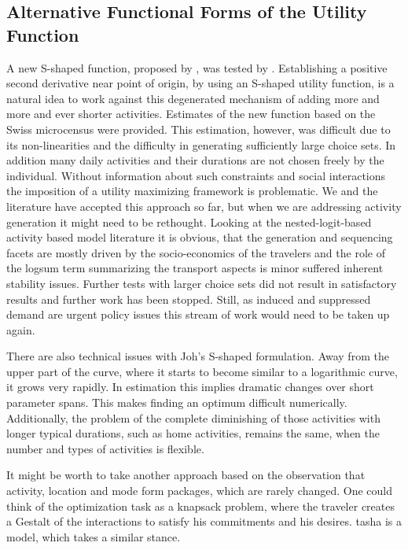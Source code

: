 \subsection{Alternative Functional Forms of the Utility Function}
\label{sec:alternative-functions}
A new S-shaped function, proposed by \citet[][]{Joh_PhDThesis_2004}, was tested by \citet[][p.129ff]{Feil_PhDThesis_2010}. 
Establishing a positive second derivative near point of origin, by using an S-shaped utility function, is a natural idea to work against this degenerated mechanism of adding more and more and ever shorter activities. 
Estimates of the new function based on the Swiss microcensus were provided. 
This estimation, however, was difficult due to its non-linearities and the difficulty in generating sufficiently large choice sets. 
In addition many daily activities and their durations are not chosen freely by the individual. 
Without information about such constraints and social interactions the imposition of a utility maximizing framework is problematic. 
We and the literature have accepted this approach so far, but when we are addressing activity generation it might need to be rethought. 
Looking at the nested-logit-based activity based model literature it is obvious, that the generation and sequencing facets are mostly driven by the socio-economics of the travelers and the role of the logsum term summarizing the transport aspects is minor suffered inherent stability issues. 
Further tests with larger choice sets did not result in satisfactory results and further work has been stopped. 
Still, as induced and suppressed demand are urgent policy issues this stream of work would need to be taken up again. 

There are also technical issues with Joh's S-shaped formulation. %
Away from the upper part of the curve, where it starts to become similar to a logarithmic curve, it grows very rapidly. 
In estimation this implies dramatic changes over short parameter spans. 
This makes finding an optimum difficult numerically. 
Additionally, the problem of the complete diminishing of those activities with longer typical durations, such as home activities, remains the same, when the number and types of activities is flexible.

It might be worth to take another approach based on the observation \citep[][and others]{SchlichEtAl_TransportRev_2004} that activity, location and mode form packages, which are rarely changed. 
One could think of the optimization task as a knapsack problem, where the traveler creates a Gestalt of the interactions to satisfy his commitments and his desires. 
\gls{tasha} is a model, which takes a similar stance. 

